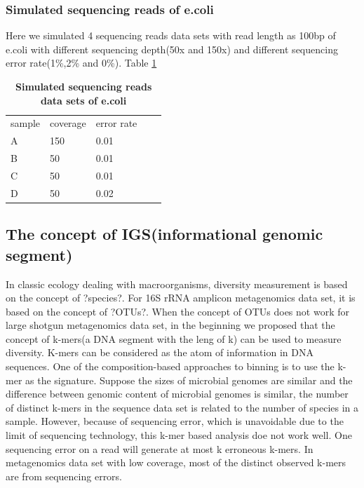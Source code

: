 \documentclass{article}
\begin{document}
\subsubsection{Simulated sequencing reads of e.coli}

Here we simulated 4 sequencing reads data sets with read length as 100bp of e.coli with different sequencing depth(50x and 150x) and different sequencing error rate(1\%,2\% and 0\%). Table \ref{table:ecoli}

\begin{table}[h]
\caption{
\bf{Simulated sequencing reads data sets of e.coli}
}
\begin{tabular}{|l|l|l|ll}
\cline{1-3}
sample & coverage & error rate &  &  \\ \cline{1-3}
A      & 150      & 0.01       &  &  \\ \cline{1-3}
B      & 50       & 0.01       &  &  \\ \cline{1-3}
C      & 50       & 0.01       &  &  \\ \cline{1-3}
D      & 50       & 0.02       &  &  \\ \cline{1-3}
\end{tabular}
\label{table:ecoli}
\end{table}


\subsection{The concept of IGS(informational genomic segment)}

In classic ecology dealing with macroorganisms, diversity measurement is based on the concept of ?species?. For 16S rRNA amplicon metagenomics data set, it is based on the concept of ?OTUs?. When the concept of OTUs does not work for large shotgun metagenomics data set, in the beginning we proposed that the concept of k-mers(a DNA segment with the leng of k) can be used to measure diversity. K-mers can be considered as the atom of information in DNA sequences. One of the composition-based approaches to binning is to use the k-mer as the signature. Suppose the sizes of microbial genomes are similar and the difference between genomic content of microbial genomes is similar, the number of distinct k-mers in the sequence data set is related to the number of species in a sample. However, because of sequencing error, which is unavoidable due to the limit of sequencing technology, this k-mer based analysis doe not work well. One sequencing error on a read will generate at most k erroneous k-mers. In metagenomics data set with low coverage, most of the distinct observed k-mers are from sequencing errors.
\end{document}
